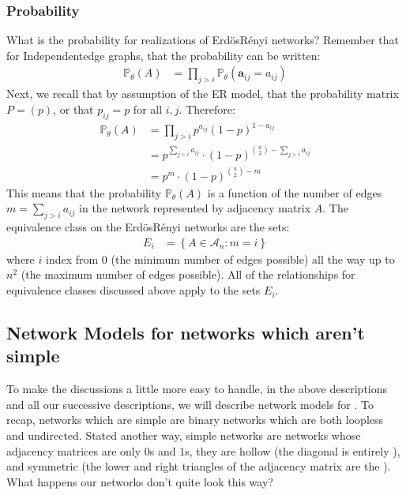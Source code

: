\documentclass[letterpaper,10pt,english]{jupyterBook}
\begin{document}
\subsubsection{Probability}
\label{\detokenize{representations/ch5/single-network-models_theory:probability}}
\sphinxAtStartPar
What is the probability for realizations of Erdös\sphinxhyphen{}Rényi networks? Remember that for Independent\sphinxhyphen{}edge graphs, that the probability can be written:
\begin{align*}
    \mathbb P_{\theta}(A) &= \prod_{j > i} \mathbb P_\theta(\mathbf{a}_{ij} = a_{ij})
\end{align*}
\sphinxAtStartPar
Next, we recall that by assumption of the ER model, that the probability matrix \(P = (p)\), or that \(p_{ij} = p\) for all \(i,j\). Therefore:
\begin{align*}
    \mathbb P_\theta(A) &= \prod_{j > i} p^{a_{ij}}(1 - p)^{1 - a_{ij}} \\
    &= p^{\sum_{j > i} a_{ij}} \cdot (1 - p)^{\binom{n}{2} - \sum_{j > i}a_{ij}} \\
    &= p^{m} \cdot (1 - p)^{\binom{n}{2} - m}
\end{align*}
\sphinxAtStartPar
This means that the probability \(\mathbb P_\theta(A)\) is a function  of the number of edges \(m = \sum_{j > i}a_{ij}\) in the network represented by adjacency matrix \(A\). The equivalence class on the Erdös\sphinxhyphen{}Rényi networks are the sets:
\begin{align*}
    E_{i} &= \left\{A \in \mathcal A_n : m = i\right\}
\end{align*}
\sphinxAtStartPar
where \(i\) index from \(0\) (the minimum number of edges possible) all the way up to \(n^2\) (the maximum number of edges possible). All of the relationships for equivalence classes discussed above apply to the sets \(E_i\).


\subsection{Network Models for networks which aren’t simple}
\label{\detokenize{representations/ch5/single-network-models_theory:network-models-for-networks-which-aren-t-simple}}
\sphinxAtStartPar
To make the discussions a little more easy to handle, in the above descriptions and all our successive descriptions, we will describe network models for . To recap, networks which are simple are binary networks which are both loopless and undirected. Stated another way, simple networks are networks whose adjacency matrices are only \(0\)s and \(1\)s, they are hollow (the diagonal is entirely ), and symmetric (the lower and right triangles of the adjacency matrix are the ). What happens our networks don’t quite look this way?
\end{document}
